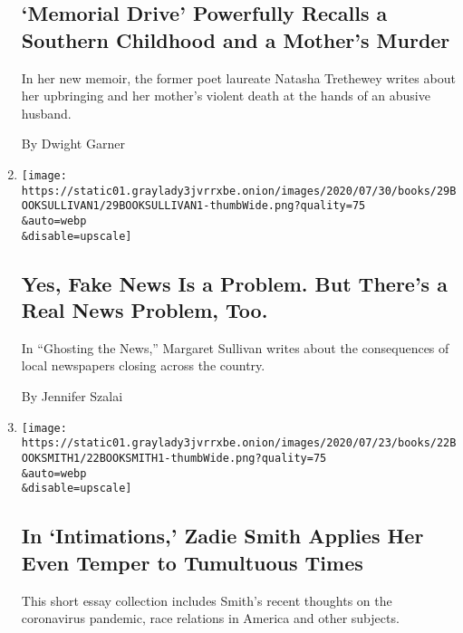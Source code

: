 \begin{enumerate}
  \hypertarget{memorial-drive-powerfully-recalls-a-southern-childhood-and-a-mothers-murder}{%
  \subsection{`Memorial Drive' Powerfully Recalls a Southern Childhood
  and a Mother's
  Murder}\label{memorial-drive-powerfully-recalls-a-southern-childhood-and-a-mothers-murder}}

  In her new memoir, the former poet laureate Natasha Trethewey writes
  about her upbringing and her mother's violent death at the hands of an
  abusive husband.

  By Dwight Garner
\item
  \href{/2020/07/26/books/review-ghosting-news-local-journalism-democracy-crisis-margaret-sullivan.html}{}

  \texttt{[image: https://static01.graylady3jvrrxbe.onion/images/2020/07/30/books/29BOOKSULLIVAN1/29BOOKSULLIVAN1-thumbWide.png?quality=75\\\&auto=webp\\\&disable=upscale]}

  \hypertarget{yes-fake-news-is-a-problem-but-theres-a-real-news-problem-too}{%
  \subsection{Yes, Fake News Is a Problem. But There's a Real News
  Problem,
  Too.}\label{yes-fake-news-is-a-problem-but-theres-a-real-news-problem-too}}

  In ``Ghosting the News,'' Margaret Sullivan writes about the
  consequences of local newspapers closing across the country.

  By Jennifer Szalai
\item
  \href{/2020/07/22/books/review-intimations-essays-zadie-smith.html}{}

  \texttt{[image: https://static01.graylady3jvrrxbe.onion/images/2020/07/23/books/22BOOKSMITH1/22BOOKSMITH1-thumbWide.png?quality=75\\\&auto=webp\\\&disable=upscale]}

  \hypertarget{in-intimations-zadie-smith-applies-her-even-temper-to-tumultuous-times}{%
  \subsection{In `Intimations,' Zadie Smith Applies Her Even Temper to
  Tumultuous
  Times}\label{in-intimations-zadie-smith-applies-her-even-temper-to-tumultuous-times}}

  This short essay collection includes Smith's recent thoughts on the
  coronavirus pandemic, race relations in America and other subjects.


\end{enumerate}
